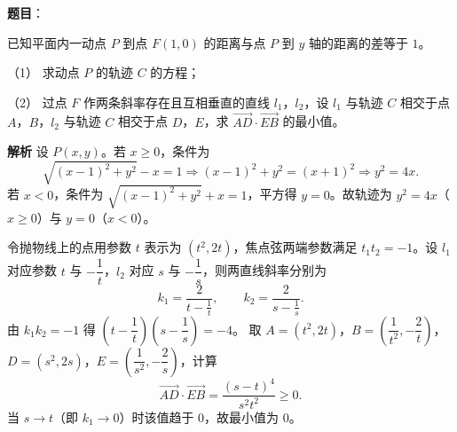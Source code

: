 \begin{answer}

\textbf{题目}：

已知平面内一动点 $P$ 到点 $F(1,0)$ 的距离与点 $P$ 到 $y$ 轴的距离的差等于 $1$。

（1） 求动点 $P$ 的轨迹 $C$ 的方程；

（2） 过点 $F$ 作两条斜率存在且互相垂直的直线 $l_1$，$l_2$，设 $l_1$ 与轨迹 $C$ 相交于点 $A$，$B$，$l_2$ 与轨迹 $C$ 相交于点 $D$，$E$，求 $\overrightarrow{AD}\cdot\overrightarrow{EB}$ 的最小值。

\textbf{解析}
设 $P(x,y)$。若 $x\geqslant0$，条件为
\nopagebreak[4]
\[\sqrt{(x-1)^2+y^2}-x=1\Longrightarrow(x-1)^2+y^2=(x+1)^2\Longrightarrow y^2=4x.\]
若 $x<0$，条件为 $\sqrt{(x-1)^2+y^2}+x=1$，平方得 $y=0$。故轨迹为 $y^2=4x$（$x\geqslant0$）与 $y=0$（$x<0$）。

令抛物线上的点用参数 $t$ 表示为 $(t^2,2t)$，焦点弦两端参数满足 $t_1t_2=-1$。设 $l_1$ 对应参数 $t$ 与 $-\dfrac1t$，$l_2$ 对应 $s$ 与 $-\dfrac1s$，则两直线斜率分别为
\nopagebreak[4]
\[k_1=\frac2{t-\frac1t},\qquad k_2=\frac2{s-\frac1s}.\]
由 $k_1k_2=-1$ 得 $\left(t-\dfrac1t\right)\left(s-\dfrac1s\right)=-4$。
取 $A=(t^2,2t)$，$B=\left(\dfrac1{t^2},-\dfrac2t\right)$，$D=(s^2,2s)$，$E=\left(\dfrac1{s^2},-\dfrac2s\right)$，计算
\nopagebreak[4]
\[\overrightarrow{AD}\cdot\overrightarrow{EB}=\frac{(s-t)^4}{s^2t^2}\geqslant0.\]
当 $s\to t$（即 $k_1\to0$）时该值趋于 $0$，故最小值为 $0$。



\end{answer}
